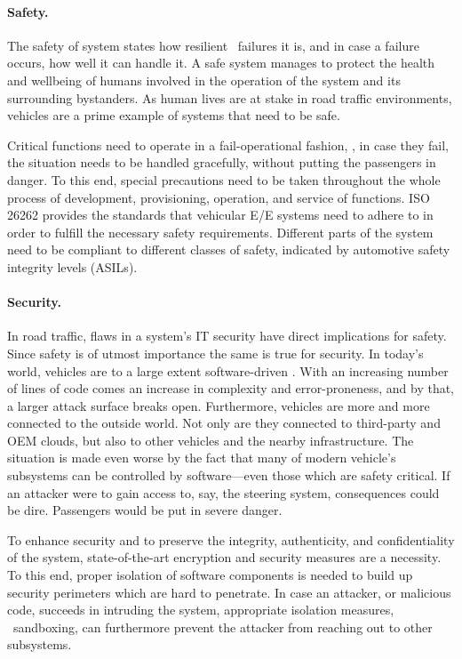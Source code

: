 \paragraph{Safety.}
The safety of system states how resilient \wrt\ failures it is, and in case a failure occurs, how well it can handle it. A safe system manages to protect the health and wellbeing of humans involved in the operation of the system and its surrounding bystanders.
As human lives are at stake in road traffic environments, vehicles are a prime example of systems that need to be safe.

Critical functions need to operate in a fail-operational fashion, \ie , in case they fail, the situation needs to be handled gracefully, without putting the passengers in danger. To this end, special precautions need to be taken throughout the whole process of development, provisioning, operation, and service of functions. ISO 26262 \cite{iso201126262} provides the standards that vehicular E/E systems need to adhere to in order to fulfill the necessary safety requirements. Different parts of the system need to be compliant to different classes of safety, indicated by automotive safety integrity levels (ASILs).

\paragraph{Security.}
In road traffic, flaws in a system's IT security have direct implications for safety. Since safety is of utmost importance the same is true for security. In today's world, vehicles are to a large extent software-driven \cite{broy2006challenges}. With an increasing number of lines of code comes an increase in complexity and error-proneness, and by that, a larger attack surface breaks open. Furthermore, vehicles are more and more connected to the outside world. Not only are they connected to third-party and OEM clouds, but also to other vehicles and the nearby infrastructure. The situation is made even worse by the fact that many of modern vehicle's subsystems can be controlled by software---even those which are safety critical.	 If an attacker were to gain access to, say, the steering system, consequences could be dire. Passengers would be put in severe danger.

To enhance security and to preserve the integrity, authenticity, and confidentiality of the system, state-of-the-art encryption and security measures are a necessity. To this end, proper isolation of software components is needed to build up security perimeters which are hard to penetrate. In case an attacker, or malicious code, succeeds in intruding the system, appropriate isolation measures, \ie\ sandboxing, can furthermore prevent the attacker from reaching out to other subsystems.

